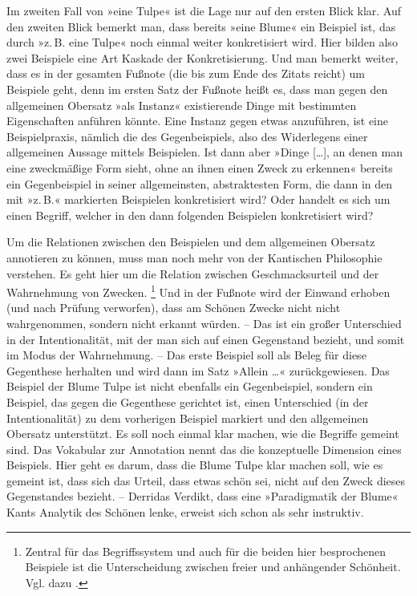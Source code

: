 \documentclass{article}
\renewcommand*{\see}{\autocap{v}gl\adddot}%
\begin{document}
Im zweiten Fall von »eine Tulpe« ist die Lage nur auf den ersten Blick
klar. Auf den zweiten Blick bemerkt man, dass bereits »eine Blume« ein
Beispiel ist, das durch »z.\,B. eine Tulpe« noch einmal weiter
konkretisiert wird. Hier bilden also zwei Beispiele eine Art Kaskade
der Konkretisierung. Und man bemerkt weiter, dass es in der gesamten
Fußnote (die bis zum Ende des Zitats reicht) um Beispiele geht, denn
im ersten Satz der Fußnote heißt es, dass man gegen den allgemeinen
Obersatz »als Instanz« existierende Dinge mit bestimmten Eigenschaften
anführen könnte. Eine Instanz gegen etwas anzuführen, ist eine
Beispielpraxis, nämlich die des Gegenbeispiels, also des Widerlegens
einer allgemeinen Aussage mittels Beispielen. Ist dann aber »Dinge
[…], an denen man eine zweckmäßige Form sieht, ohne an ihnen einen
Zweck zu erkennen« bereits ein Gegenbeispiel in seiner allgemeinsten,
abstraktesten Form, die dann in den mit »z.\,B.« markierten Beispielen
konkretisiert wird? Oder handelt es sich um einen Begriff, welcher in
den dann folgenden Beispielen konkretisiert wird?

Um die Relationen zwischen den Beispielen und dem allgemeinen Obersatz
annotieren zu können, muss man noch mehr von der Kantischen
Philosophie verstehen. Es geht hier um die Relation zwischen
Geschmacksurteil und der Wahrnehmung von Zwecken.%
\footnote{Zentral für das Begriffssystem und auch für die beiden hier
  besprochenen Beispiele ist die Unterscheidung zwischen freier und
  anhängender Schönheit. Vgl. dazu \textcite{Guesken2018a}.} %
Und in der Fußnote wird der Einwand erhoben (und nach Prüfung
verworfen), dass am Schönen Zwecke nicht
nicht %
wahrgenommen, sondern nicht erkannt würden. -- Das ist ein großer
Unterschied in der Intentionalität, mit der man sich auf einen
Gegenstand bezieht, und somit im Modus der Wahrnehmung. -- Das erste
Beispiel soll als Beleg für diese Gegenthese herhalten und wird dann
im Satz »Allein …« zurückgewiesen. Das Beispiel der Blume Tulpe ist
nicht ebenfalls ein Gegenbeispiel, sondern ein Beispiel, das gegen die
Gegenthese gerichtet ist, einen Unterschied (in der Intentionalität)
zu dem vorherigen Beispiel markiert und den allgemeinen Obersatz
unterstützt. Es soll noch einmal klar machen, wie die Begriffe gemeint
sind. Das Vokabular zur Annotation nennt das die konzeptuelle
Dimension eines Beispiels. \Parencite[\see\ auch][]{CL2013b} Hier geht
es darum, dass die Blume Tulpe klar machen soll, wie es gemeint ist,
dass sich das Urteil, dass etwas schön sei, nicht auf den Zweck dieses
Gegenstandes bezieht. -- Derridas Verdikt, dass eine »Paradigmatik der
Blume« Kants Analytik des Schönen lenke, erweist sich schon als sehr
instruktiv.
\end{document}

